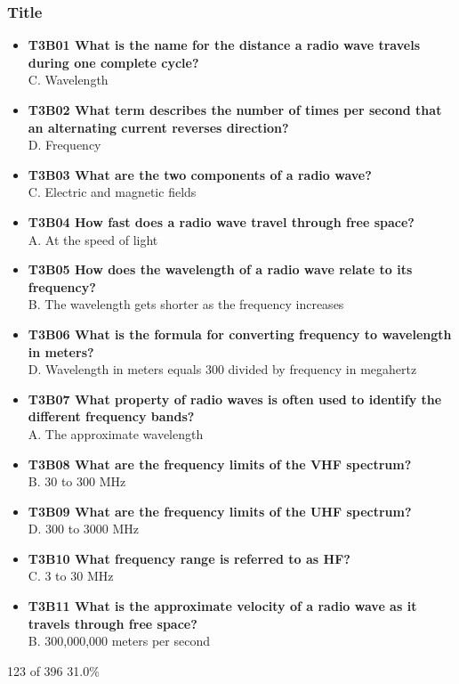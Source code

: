 \documentclass[10pt]{beamer}
\begin{document}
\begin{frame}
\frametitle{Title}
\begin{itemize}[<+->]
\tiny
\item\textbf{T3B01 What is the name for the distance a radio wave travels during one complete cycle?}\\ C. Wavelength
\item\textbf{T3B02 What term describes the number of times per second that an alternating current reverses direction?}\\ D. Frequency
\item\textbf{T3B03 What are the two components of a radio wave?}\\ C. Electric and magnetic fields
\item\textbf{T3B04 How fast does a radio wave travel through free space?}\\ A. At the speed of light
\item\textbf{T3B05 How does the wavelength of a radio wave relate to its frequency?}\\ B. The wavelength gets shorter as the frequency increases
\item\textbf{T3B06 What is the formula for converting frequency to wavelength in meters?}\\ D. Wavelength in meters equals 300 divided by frequency in megahertz
\item\textbf{T3B07 What property of radio waves is often used to identify the different frequency bands?}\\ A. The approximate wavelength
\item\textbf{T3B08 What are the frequency limits of the VHF spectrum?}\\ B. 30 to 300 MHz
\item\textbf{T3B09 What are the frequency limits of the UHF spectrum?}\\ D. 300 to 3000 MHz
\item\textbf{T3B10 What frequency range is referred to as HF?}\\ C. 3 to 30 MHz
\item\textbf{T3B11 What is the approximate velocity of a radio wave as it travels through free space?}\\ B. 300,000,000 meters per second
\end{itemize}
\tiny 123 of 396 31.0\%
\end{frame}
\end{document}
